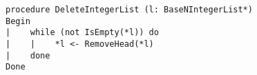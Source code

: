 \begin{lstlisting}[breaklines]
procedure DeleteIntegerList (l: BaseNIntegerList*)
Begin
|    while (not IsEmpty(*l)) do
|    |    *l <- RemoveHead(*l)
|    done
Done
\end{lstlisting}
